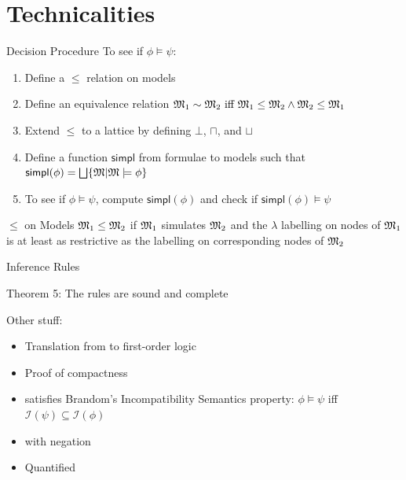 \section{Technicalities}

\begin{frame}{Decision Procedure}
To see if $\phi \models \psi$:
\begin{enumerate}
\item
Define a $\leq$ relation on models
\item
Define an equivalence relation $\frak{M}_1 \sim \frak{M}_2 \text{ iff } \frak{M}_1 \leq \frak{M}_2 \land \frak{M}_2 \leq \frak{M}_1$
\item
Extend $\leq$ to a lattice by defining $\bot$, $\sqcap$, and $\sqcup$
\item
Define a function $\mathsf{simpl}$ from formulae to models such that $\mathsf{simpl}(\phi) = \bigsqcup \{\frak{M} | \frak{M} \models \phi\}$
\item
To see if $\phi \models \psi$, compute $\mathsf{simpl}(\phi)$ and check if $\mathsf{simpl}(\phi) \models \psi$
\end{enumerate}
\end{frame}

\begin{frame}{$\leq$ on Models}
$\frak{M}_1 \leq \frak{M}_2$ if $\frak{M}_1$ simulates $\frak{M}_2$ and the $\lambda$ labelling on nodes of $\frak{M}_1$ is at least as restrictive as the labelling on corresponding nodes of $\frak{M}_2$

\end{frame}

\begin{frame}

\end{frame}

\begin{frame}

\end{frame}


\begin{frame}{Inference Rules}

\end{frame}

\begin{frame}

\end{frame}

\begin{frame}
Theorem 5: The rules are sound and complete
\end{frame}

\begin{frame}
Other stuff:
\begin{itemize}
\item
Translation from \cathoristic{} to first-order logic
\item
Proof of compactness
\item
\Cathoristic{} satisfies Brandom's Incompatibility Semantics property: $\phi \models \psi$ iff $\mathcal{I}(\psi) \subseteq \mathcal{I}(\phi)$
\item
\Cathoristic{} with negation
\item
Quantified \cathoristic{}
\end{itemize}
\end{frame}

